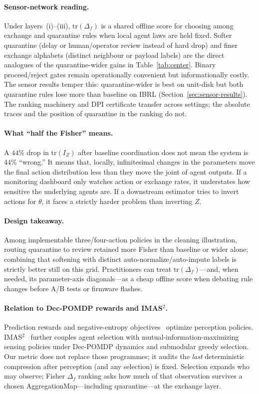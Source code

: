 \documentclass[11pt,a4paper]{article}
\begin{document}
\paragraph{Sensor-network reading.}
Under layers~(i)--(iii), $\mathrm{tr}(\Delta_f)$ is a shared offline score for
choosing among exchange and quarantine rules when local agent laws are held
fixed. Softer quarantine (delay or human/operator review instead of hard drop)
and finer exchange alphabets (distinct neighbour or payload labels) are the
direct analogues of the quarantine-wider gains in Table~\ref{tab:center}.
Binary proceed/reject gates remain operationally convenient but
informationally costly. The sensor results temper this: quarantine-wider is
best on unit-disk but both quarantine rules lose more than baseline on IBRL
(Section~\ref{sec:sensor-results}). The ranking machinery and DPI certificate
transfer across settings; the absolute traces and the position of quarantine
in the ranking do not.

\paragraph{What ``half the Fisher'' means.}
A $44\%$ drop in $\mathrm{tr}(I_Z)$ after baseline coordination does not mean
the system is $44\%$ ``wrong.'' It means that, locally, infinitesimal changes
in the parameters move the final action distribution less than they move the
joint of agent outputs. If a monitoring dashboard only watches action or
exchange rates, it understates how sensitive the underlying agents are. If a
downstream estimator tries to invert actions for $\theta$, it faces a strictly
harder problem than inverting $Z$.

\paragraph{Design takeaway.}
Among implementable three/four-action policies in the cleaning illustration,
routing quarantine to review retained more Fisher than baseline or wider alone;
combining that softening with distinct auto-normalize/auto-impute labels is
strictly better still on this grid. Practitioners can treat
$\mathrm{tr}(\Delta_f)$---and, when needed, its parameter-axis diagonals---as a
cheap offline score when debating rule changes before A/B tests or firmware
flashes.

\paragraph{Relation to Dec-POMDP rewards and IMAS$^2$.}
Prediction rewards and negative-entropy objectives~\citep{lauri2020prediction,lauri2020decpomdp}
optimize perception policies. IMAS$^2$~\citep{shi2026imas2} further couples
agent selection with mutual-information-maximizing sensing policies under
Dec-POMDP dynamics and submodular greedy selection. Our metric does not replace
those programmes; it audits the \emph{last} deterministic compression after
perception (and any selection) is fixed. Selection expands who may observe;
Fisher $\Delta_f$ ranking asks how much of that observation survives a chosen
AggregationMap---including quarantine---at the exchange layer.
\end{document}
